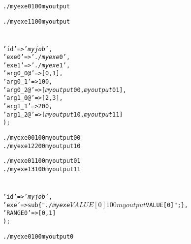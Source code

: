 \documentclass[a4paper,10pt]{report}
\begin{document}
\begin{boxnote}
\begin{alltt}
./myexe 0 100 myoutput
\end{alltt}
\end{boxnote}

\begin{boxnote}
\begin{alltt}
./myexe 1 100 myoutput
\end{alltt}
\end{boxnote}

\section{}

\begin{boxnote}
\begin{alltt}
%myjob = (
    'id' => '\textit{myjob}',
    'exe0' => '\textit{./myexe}0',
    'exe1' => '\textit{./myexe}1',
    'arg0_0@' => [0,1],
    'arg0_1' => 100,
    'arg0_2@' => [\textit{myoutput}00,\textit{myoutput}01],
    'arg1_0@' => [2,3],
    'arg1_1' => 200,
    'arg1_2@' => [\textit{myoutput}10,\textit{myoutput}11]
);
\end{alltt}
\end{boxnote}

\begin{boxnote}
\begin{alltt}
./myexe0 0 100 myoutput00
./myexe1 2 200 myoutput10
\end{alltt}
\end{boxnote}

\begin{boxnote}
\begin{alltt}
./myexe0 1 100 myoutput01
./myexe1 3 100 myoutput11
\end{alltt}
\end{boxnote}


\section{}

\begin{boxnote}
\begin{alltt}
%myjob = (
  'id' => '\textit{myjob}',
  'exe' => sub \{ "\textit{./myexe} $VALUE[0] 100 \textit{myoutput} $VALUE[0]"; \},
  'RANGE0' => [0,1]
);
\end{alltt}
\end{boxnote}

\begin{boxnote}
\begin{alltt}
./myexe 0 100 myoutput0
\end{alltt}
\end{boxnote}
\end{document}
